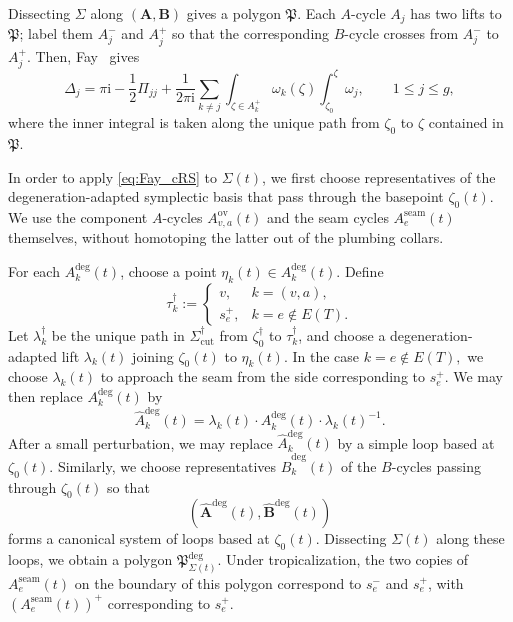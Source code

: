 \documentclass[12pt]{amsart}
\numberwithin{equation}{section}
\theoremstyle{definition}
\def\edges{E}
\def\trop{\dagger}
\def\imunit{{\mathrm{i}}}
\def\RC{{\Delta}}
\def\ptSig{\zeta}
\def\basept{{\ptSig_0}}
\def\baseptT{{\ptSig_0^\trop}}
\def\mcurve{\Sigma}
\def\tropmcurve{\mcurve^\trop}
\begin{document}
Dissecting $\mcurve$ along $(\bm A,\bm B)$ gives a polygon
$\mathfrak P$. Each $A$-cycle $A_j$ has two lifts to $\mathfrak P$;
label them $A_j^-$ and $A_j^+$ so that the corresponding $B$-cycle
crosses from $A_j^-$ to $A_j^+$. Then, Fay~\cite[Eq.~(13)]{Fay} gives
\begin{equation}
\label{eq:Fay_cRS}
\RC_j
=
\pi\imunit
-\frac{1}{2}\Pi_{jj}
+
\frac{1}{2\pi\imunit}
\sum_{k\neq j}
\int_{\zeta\in A_k^+}
\omega_k(\zeta)
\int_{\basept}^{\zeta}
\omega_j,
\qquad
1\leq j\leq g,
\end{equation}
where the inner integral is taken along the unique path from $\basept$
to $\zeta$ contained in $\mathfrak P$.


In order to apply \eqref{eq:Fay_cRS} to $\mcurve(t)$, we first choose
representatives of the degeneration-adapted symplectic basis that pass
through the basepoint $\basept(t)$. We use the component $A$-cycles
$A_{v,a}^{\mathrm{ov}}(t)$ and the seam cycles
$A_e^{\mathrm{seam}}(t)$ themselves, without homotoping the latter out
of the plumbing collars.

For each $A_k^{\mathrm{deg}}(t)$, choose a point
$
\eta_k(t)\in A_k^{\mathrm{deg}}(t).
$
Define
\[
\tau_k^\trop
:=
\begin{cases}
v,
&
k=(v,a),
\\
s_e^+,
&
k=e\notin\edges(T).
\end{cases}
\]
Let $\lambda_k^\trop$ be the unique path in
$\tropmcurve_{\mathrm{cut}}$ from $\baseptT$ to
$\tau_k^\trop$, and choose a degeneration-adapted lift $\lambda_k(t)$
joining $\basept(t)$ to $\eta_k(t)$. In the case
$
k=e\notin\edges(T),
$
we choose $\lambda_k(t)$ to approach the seam from the side
corresponding to $s_e^+$. We may then replace
$A_k^{\mathrm{deg}}(t)$ by
\[
\widehat A_k^{\mathrm{deg}}(t)
=
\lambda_k(t)
\cdot
A_k^{\mathrm{deg}}(t)
\cdot
\lambda_k(t)^{-1}.
\]
After a small perturbation, we may replace
$\widehat A_k^{\mathrm{deg}}(t)$ by a simple loop based at
$\basept(t)$. Similarly, we choose representatives
$\widehat B_k^{\mathrm{deg}}(t)$ of the $B$-cycles passing through
$\basept(t)$ so that
\[
(
\widehat{\bm A}^{\mathrm{deg}}(t),
\widehat{\bm B}^{\mathrm{deg}}(t)
)
\]
forms a canonical system of loops based at $\basept(t)$. Dissecting
$\mcurve(t)$ along these loops, we obtain a polygon
$\mathfrak P_{\mcurve(t)}^{\mathrm{deg}}$. Under tropicalization, the
two copies of $A_e^{\mathrm{seam}}(t)$ on the boundary of this polygon
correspond to $s_e^-$ and $s_e^+$, with
$(A_e^{\mathrm{seam}}(t))^+$ corresponding to $s_e^+$.
\end{document}
